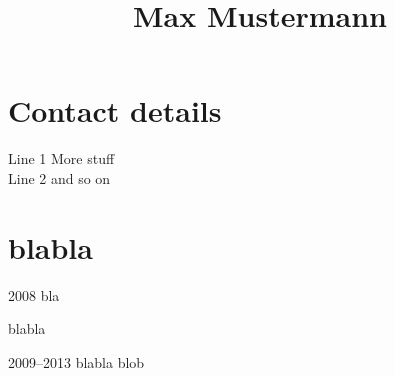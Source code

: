 \documentclass{article}
\title{Max Mustermann}
\begin{document}
\maketitle

\section{Contact details}

Line 1 \hfill More stuff\\
Line 2 \hfill and so on

\section{blabla}

\begin{CV}
\item[2008] bla
\item blabla
\item[2009--2013] blabla blob
\end{CV}
\end{document}
